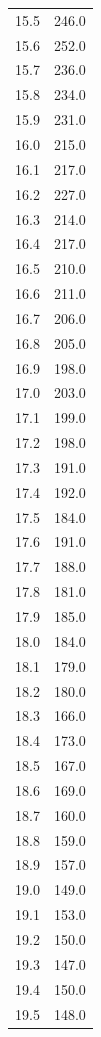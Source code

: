 \begin{minipage}{\linewidth}
\begin{table}[H]
\begin{tabular}{ll}
        15.5&		246.0 \\
        15.6&		252.0 \\
        15.7&		236.0 \\
        15.8&		234.0 \\
        15.9&		231.0 \\
        16.0&		215.0 \\
        16.1&		217.0 \\
        16.2&		227.0 \\
        16.3&		214.0 \\
        16.4&		217.0 \\
        16.5&		210.0 \\
        16.6&		211.0 \\
        16.7&		206.0 \\
        16.8&		205.0 \\
        16.9&		198.0 \\
        17.0&		203.0 \\
        17.1&		199.0 \\
        17.2&		198.0 \\
        17.3&		191.0 \\
        17.4&		192.0 \\
        17.5&		184.0 \\
        17.6&		191.0 \\
        17.7&		188.0 \\
        17.8&		181.0 \\
        17.9&		185.0 \\
        18.0&		184.0 \\
        18.1&		179.0 \\
        18.2&		180.0 \\
        18.3&		166.0 \\
        18.4&		173.0 \\
        18.5&		167.0 \\
        18.6&		169.0 \\
        18.7&		160.0 \\
        18.8&		159.0 \\
        18.9&		157.0 \\
        19.0&		149.0 \\
        19.1&		153.0 \\
        19.2&		150.0 \\
        19.3&		147.0 \\
        19.4&		150.0 \\
        19.5&		148.0 \\

\end{tabular}
\end{table}
\end{minipage}
